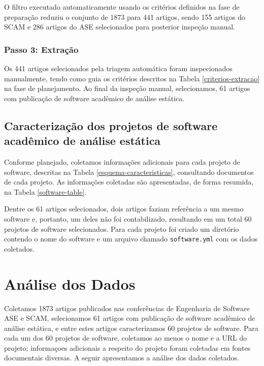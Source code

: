 O filtro executado automaticamente usando os critérios definidos na fase de
preparação reduziu o conjunto de 1873 para 441 artigos, sendo 155 artigos do SCAM e
286 artigos do ASE selecionados para posterior inspeção manual.

\subsubsection{Passo 3: Extração}

Os 441 artigos selecionados pela triagem automática foram inspecionados manualmente, tendo como guia
os critérios descritos na Tabela \ref{criterios-extracao} na fase de
planejamento. Ao final da inspeção manual, selecionamos, 61 artigos com publicação de
software acadêmico de análise estática.

\subsection{Caracterização dos projetos de software acadêmico de análise estática}

Conforme planejado, coletamos informações adicionais 
para cada projeto de software, descritas na Tabela
\ref{esquema-caracteristicas}, consultando
documentos de cada projeto. As informações coletadas são apresentadas, de forma
resumida, na Tabela \ref{software-table}.



Dentre os 61 artigos selecionados, dois artigos faziam referência a um mesmo software e,
portanto, um deles não foi contabilizado, 
resultando em um total 60 projetos de software selecionados. Para cada projeto foi criado um
diretório contendo o nome do software e um arquivo chamado
\texttt{software.yml} com os dados coletados.


\section{Análise dos Dados} \label{estudo1:analise} %

Coletamos 1873 artigos publicados nas conferências de Engenharia de Software
ASE e SCAM, selecionamos 61 artigos com publicação de software acadêmico de
análise estática, e entre estes artigos caracterizamos 60 projetos de software.
Para cada um dos 60 projetos de software, coletamos ao menos o nome e a URL do projeto;
informaçoes adicionais a respeito do projeto foram coletadas em fontes documentais diversas.
A seguir apresentamos a análise dos dados coletados.

